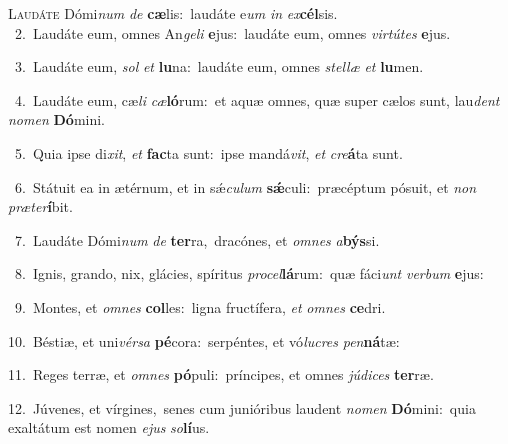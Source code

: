 \lettrine{\initial\textcolor{\initialcolor}{L}}{audáte} Dómi\textit{num} \textit{de} \textbf{cæ}\-lis:~\star laudáte e\textit{um} \textit{in} \textit{ex}\-\textbf{cél}sis.\\
{\numbfont\textcolor{\numbcolor}{~2.}}~Laudáte eum, omnes An\-\textit{ge}\-\textit{li} \textbf{e}\-jus:~\star laudáte eum, omnes \textit{vir}\-\textit{tú}\textit{tes} \textbf{e}\-jus.\par
{\numbfont\textcolor{\numbcolor}{~3.}}~Laudáte eum, \textit{sol} \textit{et} \textbf{lu}\-na:~\star laudáte eum, omnes \textit{stel}\-\textit{læ} \textit{et} \textbf{lu}\-men.\par
{\numbfont\textcolor{\numbcolor}{~4.}}~Laudáte eum, cæ\textit{li} \textit{cæ}\-\textbf{ló}rum:~\star et aquæ omnes, quæ super cælos sunt, lau\textit{dent} \textit{no}\-\textit{men} \textbf{Dó}\-mini.\par
{\numbfont\textcolor{\numbcolor}{~5.}}~Quia ipse di\-\textit{xit}\-, \textit{et} \textbf{fac}\-ta sunt:~\star ipse mandá\-\textit{vit}\-, \textit{et} \textit{cre}\-\textbf{á}ta sunt.\par
{\numbfont\textcolor{\numbcolor}{~6.}}~Státuit ea in ætérnum, et in sǽ\-\textit{cu}\-\textit{lum} \textbf{sǽ}\-culi:~\star præcéptum pósuit, et \textit{non} \textit{præ}\-\textit{ter}\textbf{í}bit.\par
{\numbfont\textcolor{\numbcolor}{~7.}}~Laudáte Dómi\textit{num} \textit{de} \textbf{ter}\-ra,~\star dracónes, et \textit{om}\-\textit{nes} \textit{a}\-\textbf{býs}si.\par
{\numbfont\textcolor{\numbcolor}{~8.}}~Ignis, grando, nix, glácies, spíritus \textit{pro}\-\textit{cel}\textbf{lá}rum:~\star quæ fáci\textit{unt} \textit{ver}\-\textit{bum} \textbf{e}\-jus:\par
{\numbfont\textcolor{\numbcolor}{~9.}}~Montes, et \textit{om}\-\textit{nes} \textbf{col}\-les:~\star ligna fructífera, \textit{et} \textit{om}\-\textit{nes} \textbf{ce}\-dri.\par
{\numbfont\textcolor{\numbcolor}{10.}}~Béstiæ, et uni\-\textit{vér}\-\textit{sa} \textbf{pé}\-cora:~\star serpéntes, et vó\-\textit{lu}\-\textit{cres} \textit{pen}\-\textbf{ná}tæ:\par
{\numbfont\textcolor{\numbcolor}{11.}}~Reges terræ, et \textit{om}\-\textit{nes} \textbf{pó}\-puli:~\star príncipes, et omnes \textit{jú}\-\textit{di}\textit{ces} \textbf{ter}\-ræ.\par
{\numbfont\textcolor{\numbcolor}{12.}}~Júvenes, et vírgines,~\dagger senes cum junióribus laudent \textit{no}\-\textit{men} \textbf{Dó}\-mini:~\star quia exaltátum est nomen \textit{e}\-\textit{jus} \textit{so}\-\textbf{lí}us.\par
